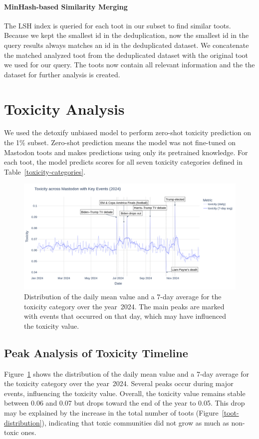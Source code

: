 \paragraph{MinHash-based Similarity Merging}\label{step:merge}
The LSH index is queried for each toot in our subset to find similar toots. Because we kept the smallest id in the deduplication, now the smallest id in the query results always matches an id in the deduplicated dataset. We concatenate the matched analyzed toot from the deduplicated dataset with the original toot we used for our query. The toots now contain all relevant information and the the dataset for further analysis is created.

\section{Toxicity Analysis}\label{step:toxicity}
We used the detoxify unbiased model to perform zero-shot toxicity prediction on the 1\% subset. Zero-shot prediction means the model was not fine-tuned on Mastodon toots and makes predictions using only its pretrained knowledge. For each toot, the model predicts scores for all seven toxicity categories defined in Table~\ref{toxicity-categories}.

\begin{figure}[tb]
    \centering
    \includegraphics[width=\textwidth]{../material/toxicity_2024.png}
    \caption{Distribution of the daily mean value and a 7-day average for the toxicity category over the year~2024. The main peaks are marked with events that occurred on that day, which may have influenced the toxicity value.}
    \label{toxicity-2024}
\end{figure}

\subsection{Peak Analysis of Toxicity Timeline} 
Figure~\ref{toxicity-2024} shows the distribution of the daily mean value and a 7-day average for the toxicity category over the year~2024. Several peaks occur during major events, influencing the toxicity value. Overall, the toxicity value remains stable between 0.06 and 0.07 but drops toward the end of the year to 0.05. This drop may be explained by the increase in the total number of toots (Figure~\ref{toot-distribution}), indicating that toxic communities did not grow as much as non-toxic ones.

